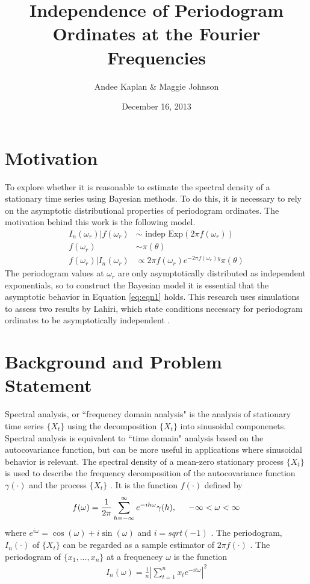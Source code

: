 \documentclass{article}\usepackage{graphicx, color}
\title{Independence of Periodogram Ordinates at the Fourier Frequencies}
\author{Andee Kaplan \& Maggie Johnson}
\date{December 16, 2013}
\theoremstyle{plain}
\begin{document}
\maketitle



\section{Motivation}

To explore whether it is reasonable to estimate the spectral density of a stationary time series using Bayesian methods. To do this, it is necessary to rely on the asymptotic distributional properties of periodogram ordinates. The motivation behind this work is the following model.
\begin{align}
\label{eq:eqn1}
I_n(\omega_r) |f(\omega_r) &\stackrel{\cdot}{\sim}\text{ indep } \text{Exp}(2\pi f(\omega_r)) \\
\label{eq:eqn2}
f(\omega_r) & \sim \pi(\theta)\\
\label{eq:eqn3}
f(\omega_r) | I_n(\omega_r) &\propto 2\pi f(\omega_r) e^{-2\pi f(\omega_r) y} \pi(\theta)
\end{align}
The periodogram values at $\omega_r$ are only asymptotically distributed as independent exponentials, so to construct the Bayesian model it is essential that the asymptotic behavior in Equation \ref{eq:eqn1} holds. This research uses simulations to assess two results by Lahiri, which state conditions necessary for periodogram ordinates to be asymptotically independent \cite{lahiri2003necessary}.


\section{Background and Problem Statement}

Spectral analysis, or ``frequency domain analysis" is the analysis of stationary time series $\{X_t\}$ using the decomposition $\{X_t\}$ into sinusoidal componenets. Spectral analysis is equivalent to ``time domain" analysis based on the autocovariance function, but can be more useful in applications where sinusoidal behavior is relevant. The spectral density of a mean-zero stationary process $\{X_t\}$ is used to describe the frequency decomposition of the autocovariance function $\gamma(\cdot)$ and the process $\{X_t\}$ \cite{brockwell2002introduction}. It is the function $f(\cdot)$ defined by 
\begin{align}
f(\omega) = \frac{1}{2\pi} \sum_{h=-\infty}^{\infty} e^{-ih\omega} \gamma(h), \hspace{.5cm} -\infty < \omega < \infty
\end{align}
where $e^{i\omega}=\cos(\omega)+i\sin(\omega)$ and $i=sqrt(-1)$ \cite{brockwell2002introduction}. The periodogram, $I_n(\cdot)$ of $\{X_t\}$ can be regarded as a sample estimator of $2\pi f(\cdot)$ \cite{brockwell2002introduction}. The periodogram of $\{x_1,...,x_n\}$ at a frequencey $\omega$ is the function
\begin{align}
I_n(\omega) = \frac{1}{n} \left\lvert \sum_{t=1}^n x_t e^{-it\omega} \right\rvert^2
\end{align}
\end{document}
